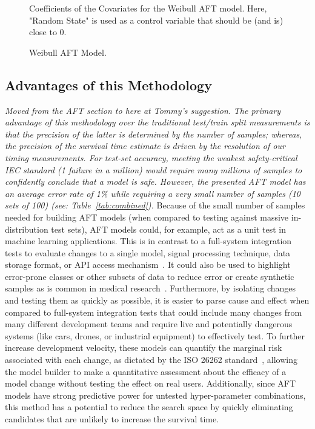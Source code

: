 \documentclass[conference]{IEEEtran}
\newcommand{\cm}[1]{\textit{{\color{blue}#1}}}
\begin{document}
{\begin{figure}[h!]
        \caption{Coefficients of the Covariates for the Weibull AFT model. Here, "Random State" is used as a control variable that should be (and is) close to 0.}
        \label{fig:aft}
    \caption{Weibull AFT Model.}
\end{figure}


\subsection{Advantages of this Methodology}
\label{advantages}
\cm{Moved from the AFT section to here at Tommy's suggestion.}
\cm{The primary advantage of this methodology over the traditional test/train split measurements is that the precision of the latter is determined by the number of samples; whereas, the precision of the survival time estimate is driven by the resolution of our timing measurements. For test-set accuracy,  meeting the weakest safety-critical IEC standard (1 failure in a million) would require many millions of samples to confidently conclude that a model is safe. However, the presented AFT model has an average error rate of 1\% while requiring a very small number of samples (10 sets of 100) (see: Table~\ref{tab:combined}).}
Because of the small number of samples needed for building AFT models (when compared to testing against massive in-distribution test sets), AFT models could, for example, act as a unit test in machine learning applications. 
This is in contrast to a full-system integration tests to evaluate changes to a single model, signal processing technique, data storage format, or API access mechanism~\cite{schmoor2000sample,lachin1981introduction}. It could also be used to highlight error-prone classes or other subsets of data to reduce error or create synthetic samples as is common in medical research~\cite{kleinbaum1996survival}. Furthermore, by isolating changes and testing them as quickly as possible, it is easier to parse cause and effect when compared to full-system integration tests that could include many changes from many different development teams and require live and potentially dangerous systems (like cars, drones, or industrial equipment) to effectively test. To further increase development velocity, these models can quantify the marginal risk associated with each change, as dictated by the ISO 26262 standard~\cite{IEC61508}, allowing the model builder to make a quantitative assessment about the efficacy of a model change without testing the effect on real users. Additionally, since AFT models have strong predictive power for untested hyper-parameter combinations, this method has a potential to reduce the search space by quickly eliminating candidates that are unlikely to increase the survival time. 

}
\end{document}
